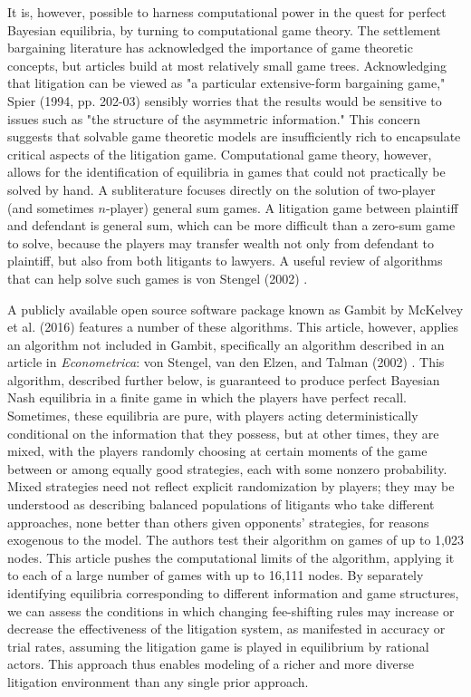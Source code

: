 \documentclass{article}
\begin{document}
It is, however, possible to harness computational power in the quest for perfect Bayesian equilibria, by turning to computational game theory. The settlement bargaining literature has acknowledged the importance of game theoretic concepts, but articles build at most relatively small game trees. Acknowledging that litigation can be viewed as "a particular extensive-form bargaining game," Spier (1994, pp. 202-03) \cite{spier} sensibly worries that the results would be sensitive to issues such as "the structure of the asymmetric information." This concern suggests that solvable game theoretic models are insufficiently rich to encapsulate critical aspects of the litigation game. Computational game theory, however, allows for the identification of equilibria in games that could not practically be solved by hand. A subliterature focuses directly on the solution of two-player (and sometimes $n$-player) general sum games. A litigation game between plaintiff and defendant is general sum, which can be more difficult than a zero-sum game to solve, because the players may transfer wealth not only from defendant to plaintiff, but also from both litigants to lawyers. A useful review of algorithms that can help solve such games is von Stengel (2002) \cite{vonstengel2002}.

A publicly available open source software package known as Gambit by McKelvey et al. (2016) \cite{mckelvey} features a number of these algorithms. This article, however, applies an algorithm not included in Gambit, specifically an algorithm described in an article in \textit{Econometrica}: von Stengel, van den Elzen, and Talman (2002) \cite{vonstengelvandenelzentalman}. This algorithm, described further below, is guaranteed to produce perfect Bayesian Nash equilibria in a finite game in which the players have perfect recall. Sometimes, these equilibria are pure, with players acting deterministically conditional on the information that they possess, but at other times, they are mixed, with the players randomly choosing at certain moments of the game between or among equally good strategies, each with some nonzero probability. Mixed strategies need not reflect explicit randomization by players; they may be understood as describing balanced populations of litigants who take different approaches, none better than others given opponents' strategies, for reasons exogenous to the model. The authors test their algorithm on games of up to 1,023 nodes. This article pushes the computational limits of the algorithm, applying it to each of a large number of games with up to 16,111 nodes. By separately identifying equilibria corresponding to different information and game structures, we can assess the conditions in which changing fee-shifting rules may increase or decrease the effectiveness of the litigation system, as manifested in accuracy or trial rates, assuming the litigation game is played in equilibrium by rational actors. This approach thus enables modeling of a richer and more diverse litigation environment than any single prior approach.
\end{document}
